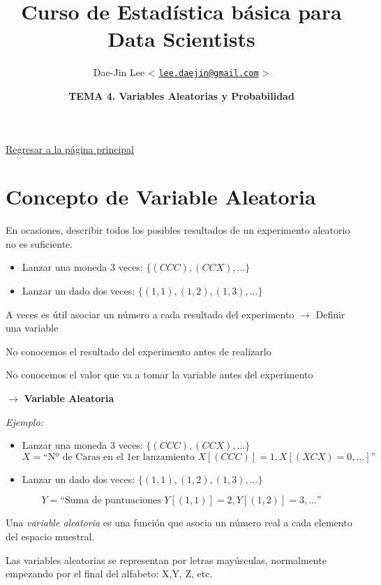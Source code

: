 \documentclass[]{article}
\title{\textbf{Curso de Estadística básica para Data Scientists}}
\author{Dae-Jin Lee \textless{}
\href{mailto:lee.daejin@gmail.com}{\nolinkurl{lee.daejin@gmail.com}}
\textgreater{}}
\date{\textbf{TEMA 4. Variables Aleatorias y Probabilidad}}
\def\tightlist{}
\numberwithin{equation}{section}
\begin{document}
\maketitle

{
\hypersetup{linkcolor=black}
\setcounter{tocdepth}{2}
\tableofcontents
}
\newpage

\href{https://idaejin.github.io/datahack/}{Regresar a la página
principal}

\section{Concepto de Variable
Aleatoria}\label{concepto-de-variable-aleatoria}

En ocasiones, describir todos los posibles resultados de un experimento
aleatorio no es suficiente.

\begin{itemize}
\tightlist
\item
  Lanzar una moneda 3 veces: \(\{(CCC), (CCX), ...\}\)
\item
  Lanzar un dado dos veces: \(\{(1,1), (1,2), (1,3), ...\}\)
\end{itemize}

A veces es útil asociar un número a cada resultado del experimento
\(\rightarrow\) Definir una variable

No conocemos el resultado del experimento antes de realizarlo

No conocemos el valor que va a tomar la variable antes del experimento

\(\rightarrow\) \textbf{Variable Aleatoria}

\emph{Ejemplo:}

\begin{itemize}
\item
  Lanzar una moneda 3 veces: \(\{(CCC), (CCX), ...\}\) \[
    X = \mbox{``Nº de Caras en el 1er lanzamiento $X[(CCC)]=1,X[(XCX)=0,...]$''}
    \]
\item
  Lanzar un dado dos veces: \(\{(1,1), (1,2), (1,3), ...\}\)
\end{itemize}

\[
      Y = \mbox{``Suma de puntuaciones $Y[(1,1)]=2,Y[(1,2)]=3,...$''}
  \]

Una \emph{variable aleatoria} es una función que asocia un número real a
cada elemento del espacio muestral.

Las variables aleatorias se representan por letras mayúsculas,
normalmente empezando por el final del alfabeto: X,Y, Z, etc.
\end{document}
